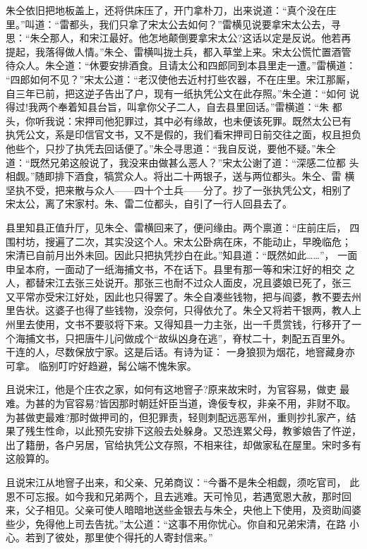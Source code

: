 朱仝依旧把地板盖上，还将供床压了，开门拿朴刀，出来说道：“真个没在庄
里。”叫道：“雷都头，我们只拿了宋太公去如何？”雷横见说要拿宋太公去，寻
思：“朱仝那人，和宋江最好。他怎地颠倒要拿宋太公?这话以定是反说。他若再
提起，我落得做人情。”朱仝、雷横叫拢土兵，都入草堂上来。宋太公慌忙置酒管
待众人。朱仝道：“休要安排酒食。且请太公和四郎同到本县里走一遭。”雷横道：
“四郎如何不见？”宋太公道：“老汉使他去近村打些农器，不在庄里。宋江那厮，
自三年已前，把这逆子告出了户，现有一纸执凭公文在此存照。”朱仝道：“如何
说得过!我两个奉着知县台旨，叫拿你父子二人，自去县里回话。”雷横道：“朱
都头，你听我说：宋押司他犯罪过，其中必有缘故，也未便该死罪。既然太公已有
执凭公文，系是印信官文书，又不是假的，我们看宋押司日前交往之面，权且担负
他些个，只抄了执凭去回话便了。”朱仝寻思道：“我自反说，要他不疑。”朱仝
道：“既然兄弟这般说了，我没来由做甚么恶人？”宋太公谢了道：“深感二位都
头相觑。”随即排下酒食，犒赏众人。将出二十两银子，送与两位都头。朱仝、雷
横坚执不受，把来散与众人——四十个土兵——分了。抄了一张执凭公文，相别了
宋太公，离了宋家村。朱、雷二位都头，自引了一行人回县去了。

县里知县正值升厅，见朱仝、雷横回来了，便问缘由。两个禀道：“庄前庄后，
四围村坊，搜遍了二次，其实没这个人。宋太公卧病在床，不能动止，早晚临危；
宋清已自前月出外未回。因此只把执凭抄白在此。”知县道：“既然如此……”，
一面申呈本府，一面动了一纸海捕文书，不在话下。县里有那一等和宋江好的相交
之人，都替宋江去张三处说开。那张三也耐不过众人面皮，况且婆娘已死了，张三
又平常亦受宋江好处，因此也只得罢了。朱仝自凑些钱物，把与阎婆，教不要去州
里告状。这婆子也得了些钱物，没奈何，只得依允了。朱仝又将若干银两，教人上
州里去使用，文书不要驳将下来。又得知县一力主张，出一千贯赏钱，行移开了一
个海捕文书，只把唐牛儿问做成个“故纵凶身在逃”，脊杖二十，刺配五百里外。
干连的人，尽数保放宁家。这是后话。有诗为证：
一身狼狈为烟花，地窨藏身亦可拿。
临别叮咛好趋避，髯公端不愧朱家。

且说宋江，他是个庄农之家，如何有这地窨子?原来故宋时，为官容易，做吏
最难。为甚的为官容易?皆因那时朝廷奸臣当道，谗佞专权，非亲不用，非财不取。
为甚做吏最难?那时做押司的，但犯罪责，轻则刺配远恶军州，重则抄扎家产，结
果了残生性命，以此预先安排下这般去处躲身。又恐连累父母，教爹娘告了忤逆，
出了籍册，各户另居，官给执凭公文存照，不相来往，却做家私在屋里。宋时多有
这般算的。

且说宋江从地窨子出来，和父亲、兄弟商议：“今番不是朱仝相觑，须吃官司，
此恩不可忘报。如今我和兄弟两个，且去逃难。天可怜见，若遇宽恩大赦，那时回
来，父子相见。父亲可使人暗暗地送些金银去与朱仝，央他上下使用，及资助阎婆
些少，免得他上司去告扰。”太公道：“这事不用你忧心。你自和兄弟宋清，在路
小心。若到了彼处，那里使个得托的人寄封信来。”

